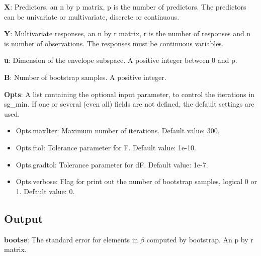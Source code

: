 \documentclass[a4paper,11pt,openany]{memoir}
\begin{document}
\begin{par}
\textbf{X}: Predictors, an n by p matrix, p is the number of predictors.  The predictors can be univariate or multivariate, discrete or continuous.
\end{par} \vspace{1em}
\begin{par}
\textbf{Y}: Multivariate responses, an n by r matrix, r is the number of responses and n is number of observations.  The responses must be continuous variables.
\end{par} \vspace{1em}
\begin{par}
\textbf{u}: Dimension of the envelope subspace.  A positive integer between 0 and p.
\end{par} \vspace{1em}
\begin{par}
\textbf{B}: Number of bootstrap samples.  A positive integer.
\end{par} \vspace{1em}
\begin{par}
\textbf{Opts}: A list containing the optional input parameter, to control the iterations in sg\_min. If one or several (even all) fields are not defined, the default settings are used.
\end{par} \vspace{1em}
\begin{itemize}
\setlength{\itemsep}{-1ex}
   \item Opts.maxIter: Maximum number of iterations.  Default value: 300.
   \item Opts.ftol: Tolerance parameter for F.  Default value: 1e-10.
   \item Opts.gradtol: Tolerance parameter for dF.  Default value: 1e-7.
   \item Opts.verbose: Flag for print out the number of bootstrap samples, logical 0 or 1. Default value: 0.
\end{itemize}


\subsection*{Output}

\begin{par}
\textbf{bootse}: The standard error for elements in $\beta$ computed by bootstrap.  An p by r matrix.
\end{par} \vspace{1em}
\end{document}
